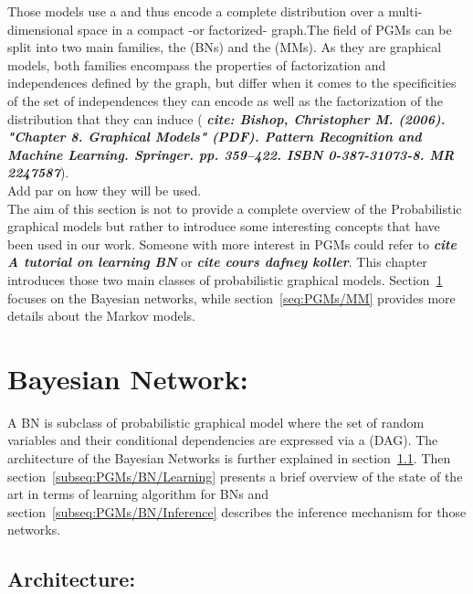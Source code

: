 \documentclass[a4paper,11pt]{report}
\begin{document}
{  Those models use a  and thus encode a complete distribution over a multi-dimensional space in a compact -or factorized- graph.The field of PGMs can be split into two main families, the  (BNs) and the  (MMs). As they are graphical models, both families encompass the properties of factorization and independences defined by the graph, but differ when it comes to the specificities of the set of independences they can encode as well as the factorization of the distribution that they can induce (  \textbf{\textit{cite: Bishop, Christopher M. (2006). "Chapter 8. Graphical Models" (PDF). Pattern Recognition and Machine Learning. Springer. pp. 359–422. ISBN 0-387-31073-8. MR 2247587}}).\\
  
  Add par on how they will be used.\\ %
  
  The aim of this section is not to provide a complete overview of the Probabilistic graphical models but rather to introduce some interesting concepts that have been used in our work. Someone with more interest in PGMs could refer to \textbf{\textit{cite A tutorial on learning BN}} or \textbf{\textit{cite cours dafney koller}}. 
  This chapter introduces those two main classes of probabilistic graphical models. Section~\ref{seq:PGMs/BN} focuses on the Bayesian networks, while section~\ref{seq:PGMs/MM} provides more details about the Markov models.
	
  \section{Bayesian Network:}  
    \label{seq:PGMs/BN}
    A BN is subclass of probabilistic graphical model where the set of random variables and their conditional dependencies are expressed via a  (DAG). The architecture of the Bayesian Networks is further explained in section~\ref{subseq:PGMs/BN/Architecture}. Then section~\ref{subseq:PGMs/BN/Learning} presents a brief overview of the state of the art in terms of learning algorithm for BNs and section~\ref{subseq:PGMs/BN/Inference} describes the inference mechanism for those networks.
        
    \subsection{Architecture:}
      \label{subseq:PGMs/BN/Architecture}
      
}
\end{document}
